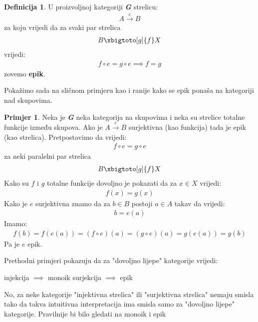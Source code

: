 \documentclass[11pt]{article}
\newcommand{\category}[1]{\textbf{\emph{#1}}}
\theoremstyle{definition}
\newtheorem{definition}{Definicija}
\newtheorem{primjer}{Primjer}
\begin{document}
  \begin{definition}
    U proizvoljnoj kategoriji \category{G} strelicu:
    \begin{align*}
      A \xrightarrow{e} B
    \end{align*}
    za koju vrijedi da za svaki par strelica
    \begin{align*}
      B \xbigtoto[g]{f} X
    \end{align*}
    vrijedi:
    \begin{align}
      f \circ e = g \circ e \implies f = g
    \end{align}
    zovemo \textbf{epik}.
  \end{definition}
  Pokažimo sada na sličnom primjeru kao i ranije kako se epik ponaša na
  kategoriji nad skupovima.
  \begin{primjer}
    Neka je \category{G} neka kategorija na skupovima i neka su strelice
    totalne funkcije između skupova.
    Ako je $A \xrightarrow{e} B$ surjektivna (kao funkcija) tada je epik (kao
    strelica).
    Pretpostavimo da vrijedi:
    \begin{align} \label{me:pr:2}
      f \circ e = g \circ e
    \end{align}
    za neki paralelni par strelica
    \begin{align*}
      B \xbigtoto[g]{f} X
    \end{align*}
    Kako su $f$ i $g$ totalne funkcije dovoljno je pokazati da za $x \in X$
    vrijedi:
    \begin{align*}
      f(x) = g(x)
    \end{align*}
    Kako je $e$ surjektivna znamo da za $b \in B$ postoji $a \in A$ takav da
    vrijedi:
    \begin{align*}
      b = e(a)
    \end{align*}
    Imamo:
    \begin{align*}
      f(b) = f(e(a)) = (f \circ e)(a) = (g \circ e)(a) = g(e(a)) = g(b)
    \end{align*}
    Pa je $e$ epik.
  \end{primjer}
    Prethodni primjeri pokazuju da za "dovoljno lijepe" kategorije vrijedi:
    \begin{center}
      injekcija $\implies$ monoik \qquad surjekcija $\implies$ epik
    \end{center}
    No, za neke kategorije "injektivna strelica" ili "surjektivna strelica"
    nemaju smisla tako da takva intuitivna interpretacija ima smisla samo za
    "dovoljno lijepe" kategorije. Pravilnije bi bilo gledati na monoik i epik
\end{document}
